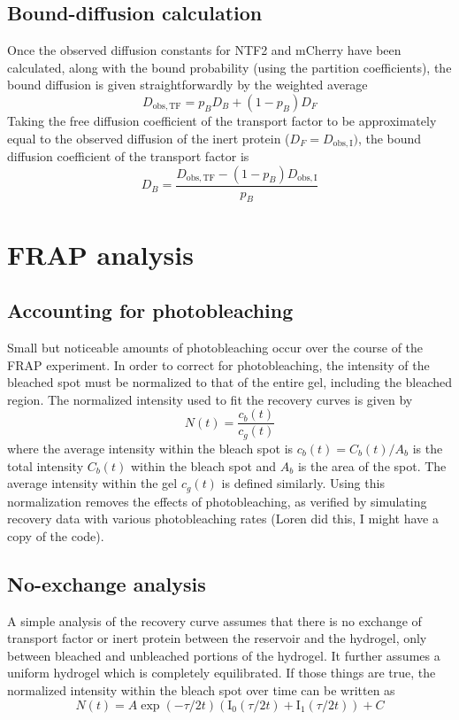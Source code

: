\subsection{Bound-diffusion calculation}

Once the observed diffusion constants for NTF2 and mCherry have been calculated, along with the bound probability (using the partition coefficients), the bound diffusion is given straightforwardly by the weighted average
\begin{equation}
D_\mathrm{obs, TF} = p_B D_B + (1-p_B) D_F
\label{eq:weighted-average}
\end{equation}
Taking the free diffusion coefficient of the transport factor to be approximately equal to the observed diffusion of the inert protein ($D_F = D_\mathrm{obs,I})$, the bound diffusion coefficient of the transport factor is
\begin{equation}
D_B = \frac{D_\mathrm{obs, TF}-(1-p_B) D_\mathrm{obs,I}}{p_B}
\label{eq:d-bound}
\end{equation}

\section{FRAP analysis}
\subsection{Accounting for photobleaching}
Small but noticeable amounts of photobleaching occur over the course of the FRAP experiment.  In order to correct for photobleaching, the intensity of the bleached spot must be normalized to that of the entire gel, including the bleached region.  The normalized intensity used to fit the recovery curves is given by
\begin{equation}
N(t) = \frac{c_b(t)}{c_g(t)}
\end{equation} where the average intensity within the bleach spot is $c_b(t) = C_b(t)/A_b$ is the total intensity $C_b(t)$ within the bleach spot and $A_b$ is the area of the spot.  The average intensity within the gel $c_g(t)$ is defined similarly.  Using this normalization removes the effects of photobleaching, as verified by simulating recovery data with various photobleaching rates (Loren did this, I might have a copy of the code).
\subsection{No-exchange analysis}
A simple analysis of the recovery curve assumes that there is no exchange of transport factor or inert protein between the reservoir and the hydrogel, only between bleached and unbleached portions of the hydrogel.  It further assumes a uniform hydrogel which is completely equilibrated.  If those things are true, the normalized intensity within the bleach spot over time can be written as
\begin{equation}
N(t) = A\exp(-\tau/2t)\left(\mathrm{I}_0(\tau/2t)+\mathrm{I}_1(\tau/2t)\right)+C
\end{equation}


